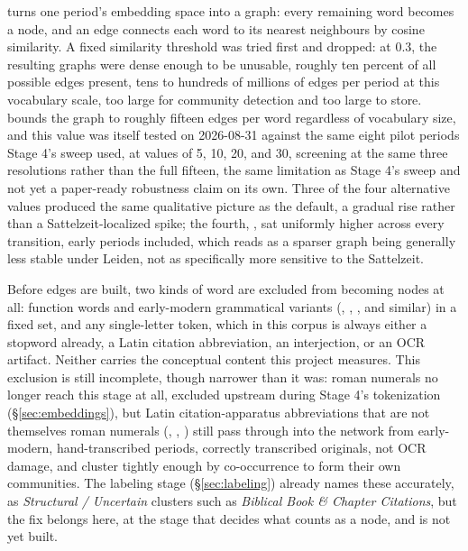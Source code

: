 \documentclass[11pt]{article}
\begin{document}
 turns one period's embedding space into a graph:
every remaining word becomes a node, and an edge connects each word to
its  nearest neighbours by cosine similarity. A fixed
similarity threshold was tried first and dropped: at 0.3, the resulting
graphs were dense enough to be unusable, roughly ten percent of all
possible edges present, tens to hundreds of millions of edges per period
at this vocabulary scale, too large for community detection and too
large to store.  bounds the graph to roughly fifteen
edges per word regardless of vocabulary size, and this value was itself
tested on 2026-08-31 against the same eight pilot periods Stage 4's
sweep used, at values of 5, 10, 20, and 30, screening at the same three
resolutions rather than the full fifteen, the same limitation as Stage
4's sweep and not yet a paper-ready robustness claim on its own. Three
of the four alternative values produced the same qualitative picture as
the default, a gradual rise rather than a Sattelzeit-localized spike;
the fourth, , sat uniformly higher across every
transition, early periods included, which reads as a sparser graph
being generally less stable under Leiden, not as specifically more
sensitive to the Sattelzeit.

Before edges are built, two kinds of word are excluded from becoming
nodes at all: function words and early-modern grammatical variants
(, , , and similar) in a fixed
 set, and any single-letter token, which in this corpus
is always either a stopword already, a Latin citation abbreviation, an
interjection, or an OCR artifact. Neither carries the conceptual content
this project measures. This exclusion is still incomplete, though
narrower than it was: roman numerals no longer reach this stage at all,
excluded upstream during Stage 4's tokenization (\S\ref{sec:embeddings}),
but Latin citation-apparatus abbreviations that are not themselves roman
numerals (, , ) still pass through
into the network from early-modern, hand-transcribed periods, correctly
transcribed originals, not OCR damage, and cluster tightly enough by
co-occurrence to form their own communities. The labeling stage
(\S\ref{sec:labeling}) already names these accurately, as
\emph{Structural / Uncertain} clusters such as \emph{Biblical Book \&
Chapter Citations}, but the fix belongs here, at the stage that decides
what counts as a node, and is not yet built.
\end{document}
